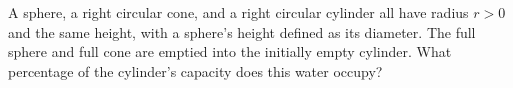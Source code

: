 A sphere, a right circular cone, and a right circular cylinder all have radius $ r>0 $ and the same height, with a sphere's height defined as its diameter. The full sphere and full cone are emptied into the initially empty cylinder. What percentage of the cylinder's capacity does this water occupy?
